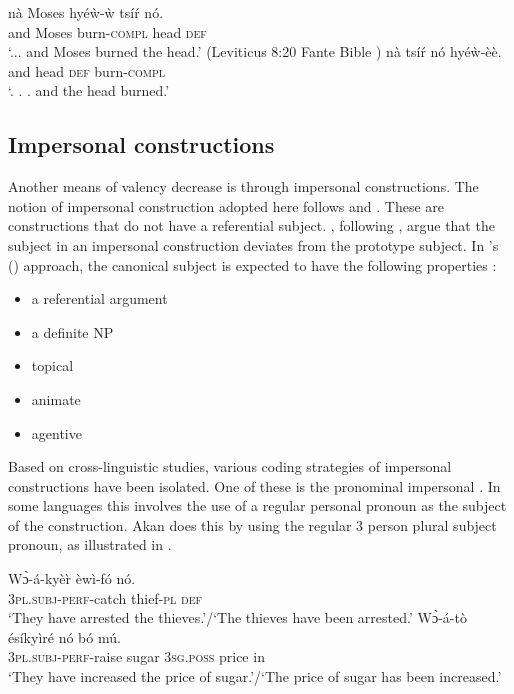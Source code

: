 \documentclass[output=paper]{langsci/langscibook}
\begin{document}
\ea\label{ex:34.osam}
\ea\label{ex:34a.osam}
\gll nà  Moses    hyéẁ-ẁ   tsíŕ  nó.\\
       and   Moses     burn-\textsc{compl}  head  \textsc{def}\\
\glt `...  and Moses burned the head.' (Leviticus 8:20 Fante Bible \citep{bible1974})
\ex\label{ex:34b.osam}
\gll  nà  tsíŕ   nó  hyéẁ-èè.\\
       and  head  \textsc{def}  burn-\textsc{compl}  \\
\glt `. .  . and the head burned.'
\z 
\z 


\subsection{Impersonal constructions}\label{§4.4:impersonal.osam}

Another means of valency decrease is through impersonal constructions. The notion of impersonal construction adopted here follows \citet{siewierska2008,siewierska2011} and \citet{malchukovogawa2011}. These are constructions that do not have a referential subject. \citet{malchukovogawa2011}, following \citet{keenan1976}, argue that the subject in an impersonal construction deviates from the prototype subject. In \citeauthor{keenan1976}'s (\citeyear{keenan1976}) approach, the canonical subject is expected to have the following properties \citep[23]{malchukovogawa2011}:

\begin{itemize}[noitemsep]
 \item  a referential argument
 \item a definite NP
 \item topical
 \item animate
 \item  agentive
\end{itemize}


Based on cross-linguistic studies, various coding strategies of impersonal constructions have been isolated. One of these is the pronominal impersonal \citep{siewierska2011}. In some languages this involves the use of a regular personal pronoun as the subject of the construction. Akan does this by using the regular 3 person plural subject pronoun, as illustrated in .

\ea\label{ex:35.osam}
\ea\label{ex:35a.osam}
\gll  Wɔ̀-á-kyè\`{r}    èwì-fó    nó.\\
       \textsc{3pl.subj}-\textsc{perf}-catch  thief-\textsc{pl}  \textsc{def}\\
\glt `They have arrested the thieves.'/`The thieves have been arrested.'
\ex\label{ex:35b.osam}
\gll   Wɔ̀-á-tò    ésíkyìré  nó    bó  mú.\\
       \textsc{3pl.subj}-\textsc{perf}-raise  sugar    \textsc{3sg.poss}  price  in\\
\glt   `They have increased the price of sugar.'/`The price of sugar has been increased.'
\z 
\z 
\end{document}
